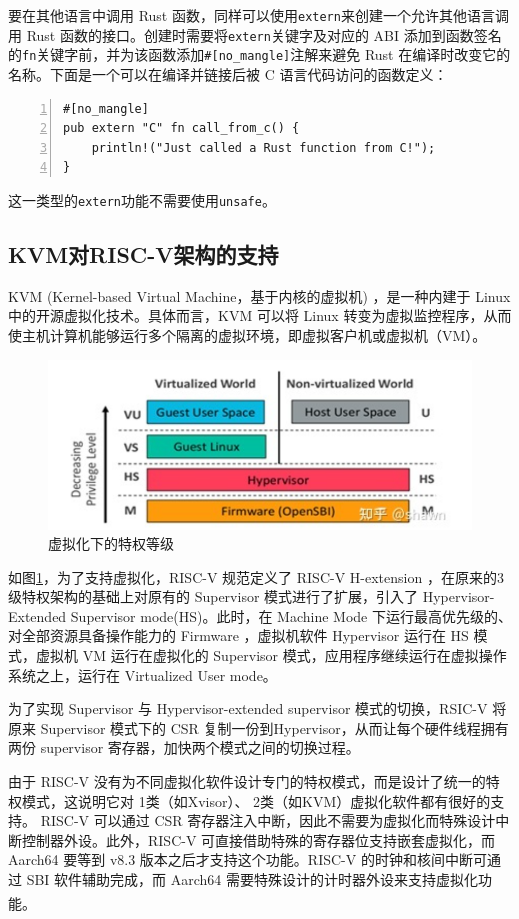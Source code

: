 \documentclass[UTF8,fontset=none,linespread=1.15]{ctexart}
\let\nosupcite\cite
\renewcommand*{\cite}[1]{\textsuperscript{\nosupcite{#1}}}
\begin{document}
要在其他语言中调用 Rust 函数，同样可以使用\texttt{extern}来创建一个允许其他语言调用 Rust 函数的接口。创建时需要将\texttt{extern}关键字及对应的 ABI 添加到函数签名的\texttt{fn}关键字前，并为该函数添加\texttt{\#[no\_mangle]}注解来避免 Rust 在编译时改变它的名称。下面是一个可以在编译并链接后被 C 语言代码访问的函数定义：
\begin{lstlisting}[numbers=left]
#[no_mangle]
pub extern "C" fn call_from_c() {
	println!("Just called a Rust function from C!");
}
\end{lstlisting}
这一类型的\texttt{extern}功能不需要使用\texttt{unsafe}。
\subsection{KVM对RISC-V架构的支持}
KVM (Kernel-based Virtual Machine，基于内核的虚拟机)  ，是一种内建于 Linux 中的开源虚拟化技术。具体而言，KVM 可以将 Linux 转变为虚拟监控程序，从而使主机计算机能够运行多个隔离的虚拟环境，即虚拟客户机或虚拟机（VM）。
\begin{figure}[!hbt]
	\centering
	\includegraphics[width=0.7\linewidth]{assets/W4}
	\caption{虚拟化下的特权等级}
	\label{fig:w4}
\end{figure}

如图\ref{fig:w4}，为了支持虚拟化，RISC-V 规范定义了 RISC-V H-extension ，在原来的3级特权架构的基础上对原有的 Supervisor 模式进行了扩展，引入了 Hypervisor-Extended Supervisor mode(HS)。此时，在 Machine Mode 下运行最高优先级的、对全部资源具备操作能力的 Firmware ，虚拟机软件 Hypervisor 运行在 HS 模式，虚拟机 VM 运行在虚拟化的 Supervisor 模式，应用程序继续运行在虚拟操作系统之上，运行在 Virtualized User mode。

为了实现 Supervisor 与 Hypervisor-extended supervisor 模式的切换，RSIC-V 将原来 Supervisor 模式下的 CSR 复制一份到Hypervisor，从而让每个硬件线程拥有两份 supervisor 寄存器，加快两个模式之间的切换过程。

由于 RISC-V 没有为不同虚拟化软件设计专门的特权模式，而是设计了统一的特权模式，这说明它对 1类（如Xvisor）、 2类（如KVM）虚拟化软件都有很好的支持。 RISC-V 可以通过 CSR 寄存器注入中断，因此不需要为虚拟化而特殊设计中断控制器外设。此外，RISC-V 可直接借助特殊的寄存器位支持嵌套虚拟化，而 Aarch64 要等到 v8.3 版本之后才支持这个功能。RISC-V 的时钟和核间中断可通过 SBI 软件辅助完成，而 Aarch64 需要特殊设计的计时器外设来支持虚拟化功能。\cite{d}
\end{document}
